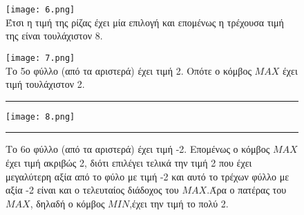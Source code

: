 \documentclass[10pt]{article}
\begin{document}
\begin{figure}[H]
    
    \texttt{[image: 6.png]}\\
    \caption{Έτσι η τιμή της ρίζας έχει μία επιλογή και επομένως η τρέχουσα τιμή της είναι τουλάχιστον 8.}
    \texttt{[image: 7.png]}\\
    \caption{Το 5ο φύλλο (από τα αριστερά) έχει τιμή 2. Οπότε ο κόμβος $MAX$ έχει τιμή τουλάχιστον 2.  }
    
    \begin{center}
        \rule{120mm}{0.2mm}
    \end{center}
    
    \vspace{1mm}
    \texttt{[image: 8.png]}\\
    \caption{Το 6ο φύλλο (από τα αριστερά) έχει τιμή -2. Επομένως ο κόμβος $MAX$ έχει τιμή ακριβώς 2, διότι επιλέγει τελικά την τιμή 2 που έχει μεγαλύτερη αξία από το φύλο με τιμή -2 και αυτό το τρέχων φύλλο με αξία -2 είναι και ο τελευταίος διάδοχος του $MAX$.Άρα ο πατέρας του $MAX$, δηλαδή ο κόμβος $MIN$,έχει την τιμή το πολύ 2.  }
    
    \begin{center}
        \rule{120mm}{0.2mm}
    \end{center}
    
\end{figure}
\end{document}
